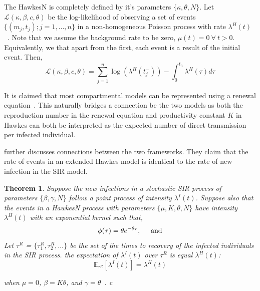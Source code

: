 \documentclass[12pt]{article}
\newtheorem{theorem}{Theorem}
\begin{document}
The HawkesN is completely defined by it's parameters $\{\kappa, \theta, N \}$. Let $\mathcal{L}(\kappa, \beta, c, \theta)$ be the log-likelihood of observing a set of events $\{(m_j, t_j); j = 1, \ldots, n\}$ in a non-homogeneous Poisson process with rate $\lambda^H(t)$~\cite{Rizoiu2018}. Note that we assume the background rate to be zero, $\mu(t) = 0 \ \forall\ t>0$. Equivalently, we that apart from the first, each event is a result of the initial event. Then,
\[
\mathcal{L}(\kappa, \beta, c, \theta) = \sum_{j=1}^n \log (\lambda^H (t_j^-)) - \int_0^{t_n} \lambda^H (\tau) d \tau
\]


It is claimed that most compartmental models can be represented using a renewal equation~\cite{Kresin2022}. This naturally bridges a connection be the two models as both the reproduction number in the renewal equation and productivity constant $K$ in Hawkes can both be interpreted as the expected number of direct transmission per infected individual.


\cite{Rizoiu2018} further discusses connections between the two frameworks. They claim that the rate of events in an extended Hawkes model is identical to the rate of new infection in the SIR model. 
\\

\begin{theorem}\label{thrm:SIR}
Suppose the new infections in a stochastic SIR process of parameters $\{\beta, \gamma, N\}$ follow a point process of intensity $\lambda^I(t)$. Suppose also that the events in a HawkesN process with parameters $\{\mu, K, \theta, N\}$ have intensity $\lambda^H (t)$ with an exponential kernel such that,
\[
\phi(\tau) =  \theta e^{-\theta \tau}, \hspace{5mm} \text{and} 
\]
Let $\tau^R$ = $\{\tau_1^R, \tau_2^R, \ldots \}$ be the set of the times to recovery of the infected individuals in the SIR process. the expectation of $\lambda^I (t)$ over $\tau^R$ is equal $\lambda^H (t)$:
\[
\mathbb{E}_{\tau^R} [ \lambda^I (t)] = \lambda^H (t)\]

when $\mu = 0$, $\beta = K \theta$, and $\gamma = \theta$~\cite{Rizoiu2018}. c
\end{theorem}
\end{document}
